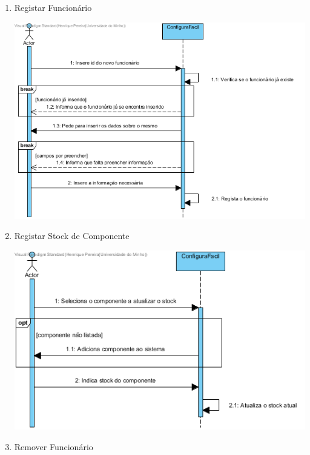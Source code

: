 \documentclass[11pt]{article} %
\begin{document}
\begin{enumerate}
	\item Registar Funcionário
		\begin{center}
 			\includegraphics[width = 6in]{dss_registar_funcionario.png}
		\end{center}
	\item Registar Stock de Componente
		\begin{center}
 			\includegraphics[width = 6in]{dss_registar_stock.png}
		\end{center}
	\item Remover Funcionário
		\begin{center}

\end{center}
\end{enumerate}
\end{document}
